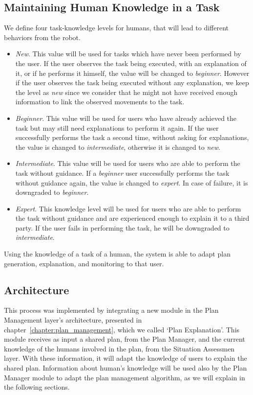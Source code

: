 \subsection{Maintaining Human Knowledge in a Task}
We define four task-knowledge levels for humans, that will lead to different behaviors from the robot.

\begin{itemize}
\item \textit{New}. This value will be used for tasks which have never been performed by the user. If the user observes the task being executed, with an explanation of it, or if he performs it himself, the value will be changed to \textit{beginner}. However if the user observes the task being executed without any explanation, we keep the level as \textit{new} since we consider that he might not have received enough information to link the observed movements to the task.
\item \textit{Beginner}. This value will be used for users who have already achieved the task but may still need explanations to perform it again. If the user successfully performs the task a second time, without asking for explanations, the value is changed to \textit{intermediate}, otherwise it is changed to \textit{new}.
\item \textit{Intermediate}. This value will be used for users who are able to perform the task without guidance. If a \textit{beginner} user successfully performs the task without guidance again, the value is changed to \textit{expert}. In case of failure, it is downgraded to \textit{beginner}.
\item \textit{Expert}. This knowledge level will be used for users who are able to perform the task without guidance and are experienced enough to explain it to a third party. If the user fails in performing the task, he will be downgraded to \textit{intermediate}.
\end{itemize}

Using the knowledge of a task of a human, the system is able to adapt plan generation, explanation, and monitoring to that user.


\subsection{Architecture}
This process was implemented by integrating a new module in the Plan Management layer's architecture, presented in chapter~\ref{chapter:plan_management}, which we called `Plan Explanation'. This module receives as input a shared plan, from the Plan Manager, and the current knowledge of the humans involved in the plan, from the Situation Assessmen layer. With these information, it will adapt the knowledge of users to explain the shared plan. Information about human's knowledge will be used also by the Plan Manager module to adapt the plan management algorithm, as we will explain in the following sections.

